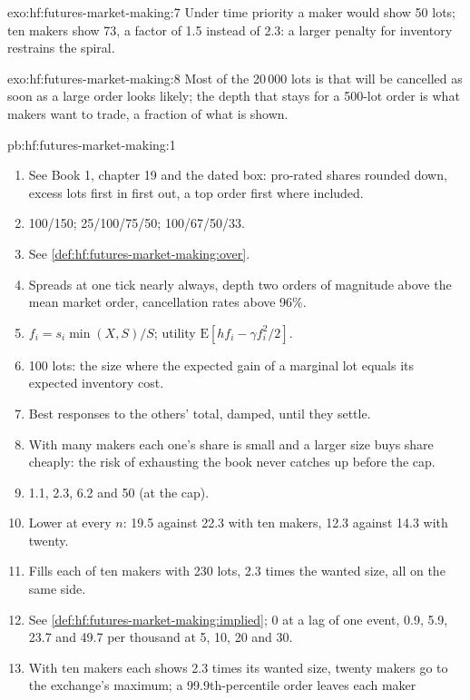 \begin{solution}{exo:hf:futures-market-making:7}
Under time priority a maker would show 50 lots; ten makers show 73, a factor of 1.5 instead of 2.3: a larger penalty for inventory restrains the
spiral.
\end{solution}

\begin{solution}{exo:hf:futures-market-making:8}
Most of the 20\,000 lots is  that will be cancelled as soon as a large order looks likely; the depth that stays for a 500-lot order is
what makers want to trade, a fraction of what is shown.
\end{solution}

\begin{solution}{pb:hf:futures-market-making:1}
\begin{enumerate}
\item See Book 1, chapter 19 and the dated box: pro-rated shares rounded down, excess lots first in first out, a top order first where included.
\item 100/150; 25/100/75/50; 100/67/50/33.
\item See \cref{def:hf:futures-market-making:over}.
\item Spreads at one tick nearly always, depth two orders of magnitude above the mean market order, cancellation rates above 96\%.
\item $f_i=s_i\min(X,S)/S$; utility $\mathrm{E}[hf_i-\gamma f_i^2/2]$.
\item 100 lots: the size where the expected gain of a marginal lot equals its expected inventory cost.
\item Best responses to the others' total, damped, until they settle.
\item With many makers each one's share is small and a larger size buys share cheaply: the risk of exhausting the book never catches up before the
cap.
\item 1.1, 2.3, 6.2 and 50 (at the cap).
\item Lower at every $n$: 19.5 against 22.3 with ten makers, 12.3 against 14.3 with twenty.
\item Fills each of ten makers with 230 lots, 2.3 times the wanted size, all on the same side.
\item See \cref{def:hf:futures-market-making:implied}; 0 at a lag of one event, 0.9, 5.9, 23.7 and 49.7 per thousand at 5, 10, 20 and 30.
\item With ten makers each shows 2.3 times its wanted size, twenty makers go to the exchange's maximum; a 99.9th-percentile order leaves each maker

\end{enumerate}
\end{solution}
